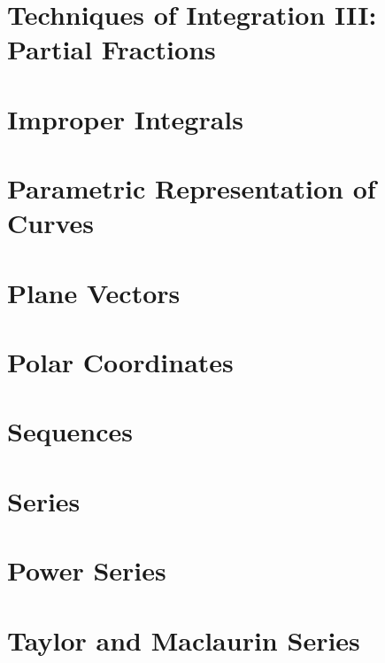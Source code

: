 \documentclass[10pt]{article}  %
\begin{document}
\section{Techniques of Integration III: Partial Fractions}


\section{Improper Integrals}


\section{Parametric Representation of Curves}


\section{Plane Vectors}


\section{Polar Coordinates}


\section{Sequences}


\section{Series}


\section{Power Series}


\section{Taylor and Maclaurin Series}

\end{document}
